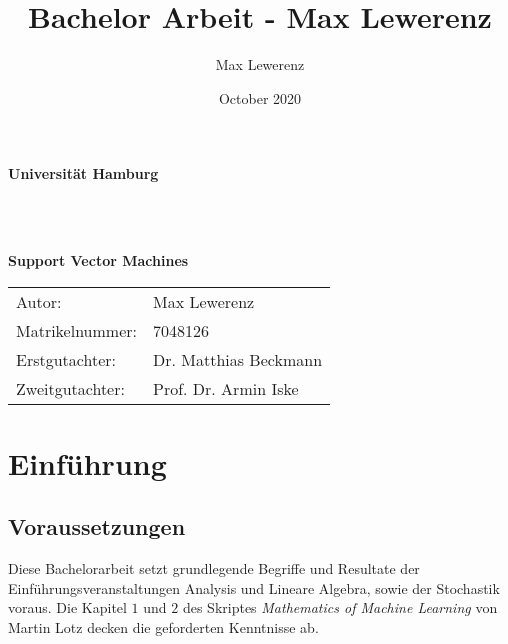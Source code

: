 \documentclass{article}
\title{Bachelor Arbeit - Max Lewerenz}
\author{Max Lewerenz}
\date{October 2020}
\theoremstyle{plain}
\theoremstyle{definition}
\begin{document}
\begin{titlepage}
    \begin{center}

       \huge\textbf{Universität Hamburg}\\
       \Large{}
       
       \vspace*{2cm}
       
       \large{}\\
       \large{}\\
       \large{}
       
       \vspace*{3cm}
       
       \Huge\textbf{Support Vector Machines}\\
       \huge{}
       
       \vspace*{3cm}
       
       \normalsize
       \begin{tabular}{ll}
            Autor: & Max Lewerenz\\
            Matrikelnummer: & 7048126\\
            Erstgutachter: & Dr. Matthias Beckmann \\
            Zweitgutachter: & Prof. Dr. Armin Iske
       \end{tabular}
       
       \vspace*{2cm}
       
    \end{center}   
    
\end{titlepage}

\tableofcontents


\newpage

\section{Einführung}
\subsection{Voraussetzungen}
    Diese Bachelorarbeit setzt grundlegende Begriffe und Resultate der Einführungsveranstaltungen Analysis und Lineare Algebra, sowie der Stochastik voraus. Die Kapitel $1$ und $2$ des Skriptes \textit{Mathematics of Machine Learning} von Martin Lotz decken die geforderten Kenntnisse ab.
    
\end{document}
